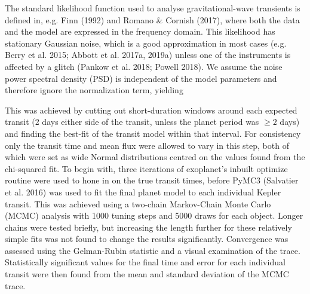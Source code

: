\documentclass[floatfix,ApJL,twocolumn]{aastex631}
\begin{document}
The standard likelihood function used to analyse gravitational-wave transients is defined in, e.g. Finn (1992) and Romano \& Cornish (2017), where both the data and the model are expressed in the frequency domain. This likelihood has stationary Gaussian noise, which is a good approximation in most cases (e.g. Berry et al. 2015; Abbott et al. 2017a, 2019a) unless one of the instruments is affected by a glitch (Pankow et al. 2018; Powell 2018). We assume the noise power spectral density (PSD) is independent of the model parameters and therefore ignore the normalization term, yielding



This was achieved
by cutting out short-duration windows around each expected transit
(2 days either side of the transit, unless the planet period was $\geq2$
days) and finding the best-fit of the transit model within that interval.
For consistency only the transit time and mean flux were allowed to
vary in this step, both of which were set as wide Normal distributions
centred on the values found from the chi-squared fit. To begin with,
three iterations of exoplanet’s inbuilt optimize routine were used
to hone in on the true transit times, before PyMC3 (Salvatier et al.
2016) was used to fit the final planet model to each individual Kepler
transit. This was achieved using a two-chain Markov-Chain Monte
Carlo (MCMC) analysis with 1000 tuning steps and 5000 draws
for each object. Longer chains were tested briefly, but increasing
the length further for these relatively simple fits was not found to
change the results significantly. Convergence was assessed using
the Gelman-Rubin statistic and a visual examination of the trace.
Statistically significant values for the final time and error for each
individual transit were then found from the mean and standard
deviation of the MCMC trace.

%
%
%
%
\end{document}
